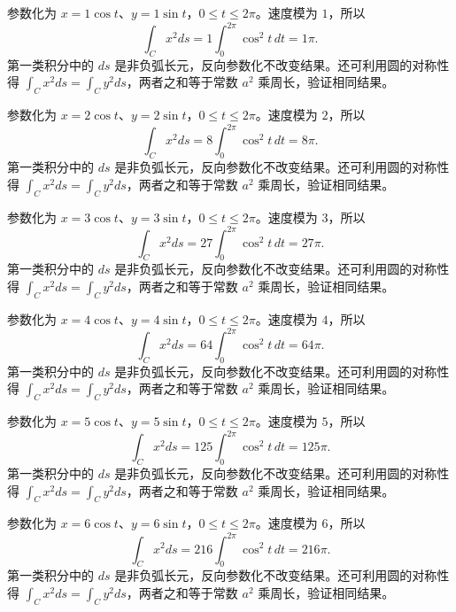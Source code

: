 \documentclass[12pt,fontset=fandol]{ctexart}
\begin{document}
\begin{solve}\label{ans:c41q2}
参数化为 $x=1\cos t$、$y=1\sin t$，$0\le t\le2\pi$。速度模为 $1$，所以
\[
\int_Cx^2ds=1\int_0^{2\pi}\cos^2t\,dt=1\pi.
\]
第一类积分中的 $ds$ 是非负弧长元，反向参数化不改变结果。还可利用圆的对称性得 $\int_Cx^2ds=\int_Cy^2ds$，两者之和等于常数 $a^2$ 乘周长，验证相同结果。
\end{solve}

\begin{solve}\label{ans:c41q3}
参数化为 $x=2\cos t$、$y=2\sin t$，$0\le t\le2\pi$。速度模为 $2$，所以
\[
\int_Cx^2ds=8\int_0^{2\pi}\cos^2t\,dt=8\pi.
\]
第一类积分中的 $ds$ 是非负弧长元，反向参数化不改变结果。还可利用圆的对称性得 $\int_Cx^2ds=\int_Cy^2ds$，两者之和等于常数 $a^2$ 乘周长，验证相同结果。
\end{solve}

\begin{solve}\label{ans:c41q4}
参数化为 $x=3\cos t$、$y=3\sin t$，$0\le t\le2\pi$。速度模为 $3$，所以
\[
\int_Cx^2ds=27\int_0^{2\pi}\cos^2t\,dt=27\pi.
\]
第一类积分中的 $ds$ 是非负弧长元，反向参数化不改变结果。还可利用圆的对称性得 $\int_Cx^2ds=\int_Cy^2ds$，两者之和等于常数 $a^2$ 乘周长，验证相同结果。
\end{solve}

\begin{solve}\label{ans:c41q5}
参数化为 $x=4\cos t$、$y=4\sin t$，$0\le t\le2\pi$。速度模为 $4$，所以
\[
\int_Cx^2ds=64\int_0^{2\pi}\cos^2t\,dt=64\pi.
\]
第一类积分中的 $ds$ 是非负弧长元，反向参数化不改变结果。还可利用圆的对称性得 $\int_Cx^2ds=\int_Cy^2ds$，两者之和等于常数 $a^2$ 乘周长，验证相同结果。
\end{solve}

\begin{solve}\label{ans:c41q6}
参数化为 $x=5\cos t$、$y=5\sin t$，$0\le t\le2\pi$。速度模为 $5$，所以
\[
\int_Cx^2ds=125\int_0^{2\pi}\cos^2t\,dt=125\pi.
\]
第一类积分中的 $ds$ 是非负弧长元，反向参数化不改变结果。还可利用圆的对称性得 $\int_Cx^2ds=\int_Cy^2ds$，两者之和等于常数 $a^2$ 乘周长，验证相同结果。
\end{solve}

\begin{solve}\label{ans:c41q7}
参数化为 $x=6\cos t$、$y=6\sin t$，$0\le t\le2\pi$。速度模为 $6$，所以
\[
\int_Cx^2ds=216\int_0^{2\pi}\cos^2t\,dt=216\pi.
\]
第一类积分中的 $ds$ 是非负弧长元，反向参数化不改变结果。还可利用圆的对称性得 $\int_Cx^2ds=\int_Cy^2ds$，两者之和等于常数 $a^2$ 乘周长，验证相同结果。
\end{solve}
\end{document}
